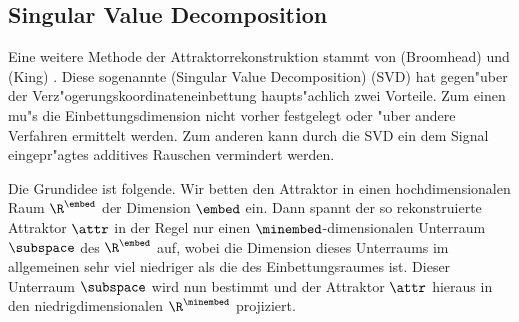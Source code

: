 \subsection{Singular Value Decomposition}
\label{chapsvd}
Eine weitere Methode der Attraktorrekonstruktion stammt von \autor(Broomhead) und
\autor(King) \cite{broomhead-king}. Diese sogenannte \begriff(Singular Value
Decomposition) (SVD) hat gegen"uber der Verz"ogerungskoordinateneinbettung haupts"achlich
zwei Vorteile. Zum einen mu"s die Einbettungsdimension nicht vorher festgelegt oder "uber
andere Verfahren ermittelt werden. Zum anderen kann durch die SVD ein dem Signal
eingepr"agtes additives Rauschen vermindert werden.

Die Grundidee ist folgende. Wir betten den Attraktor in einen hochdimensionalen Raum
$\R^\embed$ der Dimension $\embed$ ein. Dann spannt der so rekonstruierte Attraktor
$\attr$ in der Regel nur einen $\minembed$-dimensio\-nalen Unterraum $\subspace$ des
$\R^\embed$ auf, wobei die Dimension dieses Unterraums im allgemeinen sehr viel niedriger
als die des Einbettungsraumes ist.  Dieser Unterraum $\subspace$ wird nun bestimmt und der
Attraktor $\attr$ hieraus in den niedrigdimensionalen $\R^\minembed$ projiziert.

